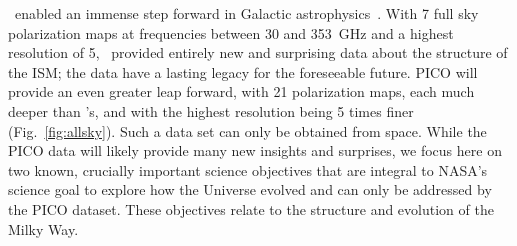 \documentclass[PICOReport.tex]{subfiles}
\begin{document}
\planck\ enabled an immense step forward in Galactic astrophysics~\citep{Planck2018:XII}. With 7 full sky polarization maps at frequencies between 30 
and 353~GHz and a highest resolution of 5\arcmin, \planck\ provided entirely new and surprising data about the structure of the ISM; the data have a lasting legacy for the foreseeable future. PICO will provide an even greater leap forward, with 21 polarization maps, each much deeper than \planck's, and with the highest resolution being 5 times finer (Fig.~\ref{fig:allsky}). Such a data set can only be obtained from space. 
While the PICO data will likely provide many new insights and surprises, we focus here on two known, crucially important science objectives that are integral to NASA's science goal to explore how the Universe evolved and can only be addressed by the PICO dataset. These objectives relate to the structure and evolution of the Milky Way. \\
%
%
\end{document}
